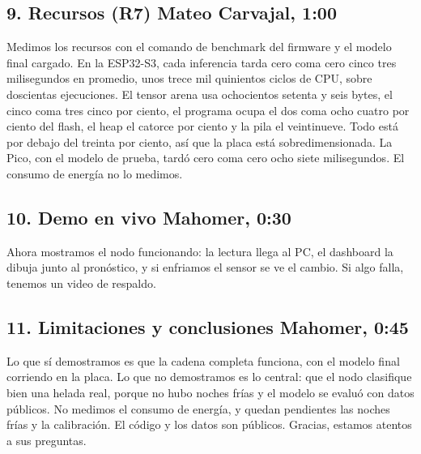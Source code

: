\documentclass[11pt,a4paper]{article}
\begin{document}
\subsection*{9. Recursos (R7) \hfill \small Mateo Carvajal, 1:00}
Medimos los recursos con el comando de benchmark del firmware y el modelo final cargado. En la ESP32-S3, cada inferencia tarda cero coma cero cinco tres milisegundos en promedio, unos trece mil quinientos ciclos de CPU, sobre doscientas ejecuciones. El tensor arena usa ochocientos setenta y seis bytes, el cinco coma tres cinco por ciento, el programa ocupa el dos coma ocho cuatro por ciento del flash, el heap el catorce por ciento y la pila el veintinueve. Todo está por debajo del treinta por ciento, así que la placa está sobredimensionada. La Pico, con el modelo de prueba, tardó cero coma cero ocho siete milisegundos. El consumo de energía no lo medimos.

\subsection*{10. Demo en vivo \hfill \small Mahomer, 0:30}
Ahora mostramos el nodo funcionando: la lectura llega al PC, el dashboard la dibuja junto al pronóstico, y si enfriamos el sensor se ve el cambio. Si algo falla, tenemos un video de respaldo.

\subsection*{11. Limitaciones y conclusiones \hfill \small Mahomer, 0:45}
Lo que sí demostramos es que la cadena completa funciona, con el modelo final corriendo en la placa. Lo que no demostramos es lo central: que el nodo clasifique bien una helada real, porque no hubo noches frías y el modelo se evaluó con datos públicos. No medimos el consumo de energía, y quedan pendientes las noches frías y la calibración. El código y los datos son públicos. Gracias, estamos atentos a sus preguntas.
\end{document}
